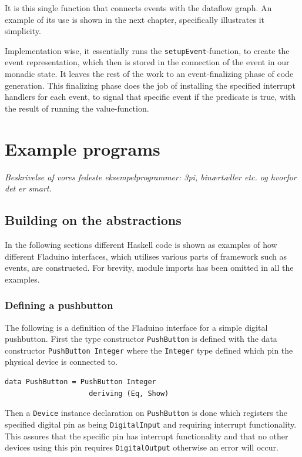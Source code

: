\documentclass[a4paper, oneside, final]{memoir}
\let\fref\undefined
\begin{document}
\noindent
It is this single function that connects events with the dataflow
graph. An example of its use is shown in the next chapter,
specifically \fref{fig:onEvent usage} illustrates it simplicity.

Implementation wise, it essentially runs the
\verb|setupEvent|-function, to create the event representation, which
then is stored in the connection of the event in our monadic state.
It leaves the rest of the work to an event-finalizing phase of code
generation.  This finalizing phase does the job of installing the
specified interrupt handlers for each event, to signal that specific
event if the predicate is true, with the result of running the
value-function.

\chapter{Example programs}

\textit{Beskrivelse af vores fedeste eksempelprogrammer: 3pi,
  binærtæller etc. og hvorfor det er smart.}

\section{Building on the abstractions}

In the following sections different Haskell code is shown as examples of how
different Fladuino interfaces, which utilises various parts of framework such as
events, are constructed. For brevity, module imports has been omitted in all the
examples.

\subsection{Defining a pushbutton}
\label{sec:pushbuttondef}

The following is a definition of the Fladuino interface for a simple digital
pushbutton. First the type constructor \texttt{PushButton} is defined with the
data constructor \texttt{PushButton Integer} where the \texttt{Integer} type
defined which pin the physical device is connected to.

\begin{verbatim}
data PushButton = PushButton Integer
                    deriving (Eq, Show)
\end{verbatim}

\noindent
Then a \texttt{Device} instance declaration on \texttt{PushButton} is done which
registers the specified digital pin as being \texttt{DigitalInput} and requiring
interrupt functionality. This assures that the specific pin has interrupt
functionality and that no other devices using this pin requires
\texttt{DigitalOutput} otherwise an error will occur.
\end{document}
